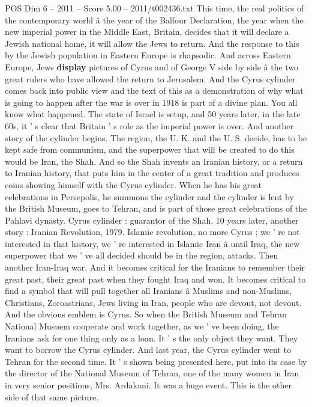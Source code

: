 \begin{textsample}{POS Dim 6 – 2011 – Score 5.00 – 2011/t002436.txt}
This time, the real politics of the contemporary world â the year of the Balfour Declaration, the year when the new imperial power in the Middle East, Britain, decides that it will declare a Jewish national home, it will allow the Jews to return.
And the response to this by the Jewish population in Eastern Europe is rhapsodic.
And across Eastern Europe, Jews \textbf{display} pictures of Cyrus and of George V side by side â the two great rulers who have allowed the return to Jerusalem.
And the Cyrus cylinder comes back into public view and the text of this as a demonstration of why what is going to happen after the war is over in 1918 is part of a divine plan.
You all know what happened.
The state of Israel is setup, and 50 years later, in the late 60s, it ' s clear that Britain ' s role as the imperial power is over.
And another story of the cylinder begins.
The region, the U.
K. and the U.
S. decide, has to be kept safe from communism, and the superpower that will be created to do this would be Iran, the Shah.
And so the Shah invents an Iranian history, or a return to Iranian history, that puts him in the center of a great tradition and produces coins showing himself with the Cyrus cylinder.
When he has his great celebrations in Persepolis, he summons the cylinder and the cylinder is lent by the British Museum, goes to Tehran, and is part of those great celebrations of the Pahlavi dynasty.
Cyrus cylinder : guarantor of the Shah. 10 years later, another story : Iranian Revolution, 1979.
Islamic revolution, no more Cyrus ; we ' re not interested in that history, we ' re interested in Islamic Iran â until Iraq, the new superpower that we ' ve all decided should be in the region, attacks.
Then another Iran-Iraq war.
And it becomes critical for the Iranians to remember their great past, their great past when they fought Iraq and won.
It becomes critical to find a symbol that will pull together all Iranians â Muslims and non-Muslims, Christians, Zoroastrians, Jews living in Iran, people who are devout, not devout.
And the obvious emblem is Cyrus.
So when the British Museum and Tehran National Musuem cooperate and work together, as we ' ve been doing, the Iranians ask for one thing only as a loan.
It ' s the only object they want.
They want to borrow the Cyrus cylinder.
And last year, the Cyrus cylinder went to Tehran for the second time.
It ' s shown being presented here, put into its case by the director of the National Museum of Tehran, one of the many women in Iran in very senior positions, Mrs.
Ardakani.
It was a huge event.
This is the other side of that same picture.

\end{textsample}

